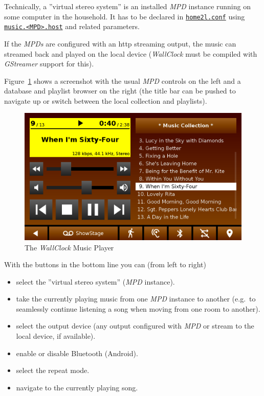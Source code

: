 \documentclass[12pt,english,parskip=half]{scrreprt}
\newcommand{\idx}[1]{#1\index{#1}}
\newcommand{\envref}[1]{\hyperref[env:#1]{\texttt{#1}}}        %
\newcommand{\toolref}[1]{\hyperref[tool:#1]{\texttt{\idx{#1}}}}
\begin{document}
Technically, a ''virtual stereo system'' is an installed \emph{MPD}
instance running on some computer in the household. It has to be
declared in \toolref{home2l.conf} using \envref{music.<MPD>.host}
and related parameters.

If the \emph{MPDs} are configured with an http streaming output, the
music can streamed back and played on the local device (\emph{WallClock}
must be compiled with \emph{GStreamer} support for this).

Figure~\ref{fig:screen-wallclock-music} shows a screenshot
with the usual \emph{MPD} controls on the left and a database and
playlist browser on the right (the title bar can be pushed to navigate
up or switch between the local collection and playlists).


\begin{figure}[ht]
  \centering
  \includegraphics[width=0.7\linewidth]{figs/screen-wallclock-music.png}
  \caption[l]{The \emph{WallClock} Music Player}
  \label{fig:screen-wallclock-music}
\end{figure}


With the buttons in the bottom line you can (from left to right)

\begin{itemize}
\item
  select the ''virtual stereo system'' (\emph{MPD} instance).
\item
  take the currently playing music from one \emph{MPD} instance to another
  (e.g.~to seamlessly continue listening a song when moving from one room to another).
\item
  select the output device (any output configured with \emph{MPD} or
  stream to the local device, if available).
\item
  enable or disable Bluetooth (Android).
\item
  select the repeat mode.
\item
  navigate to the currently playing song.
\end{itemize}
\end{document}
